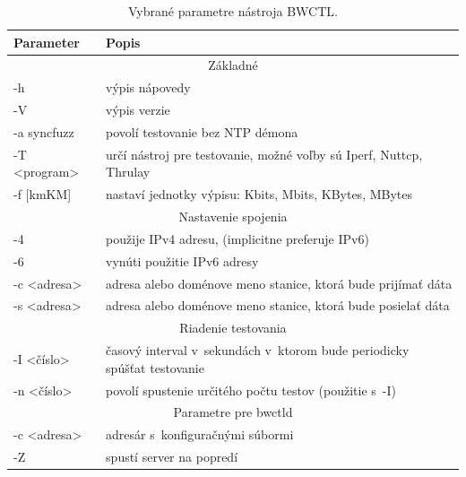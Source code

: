         \begin{table}[H]
            \begin{center}
                \begin{tabular}{|l|p{11cm}|}
                    \hline
                     \textbf{Parameter}  &  \textbf{Popis}  \\
                    \hline
                    \multicolumn{2}{|c|}{Základné} \\
                    \hline
                    -h  &  výpis nápovedy \\ 
                    -V  &  výpis verzie  \\
                    -a syncfuzz & povolí testovanie bez NTP démona \\
                    -T \textless program\textgreater & 
                        určí nástroj pre testovanie,
                        možné voľby sú Iperf, Nuttcp, Thrulay \\
                    -f [kmKM] &
                        nastaví jednotky výpisu: Kbits, Mbits,
                        KBytes, MBytes \\
                    \hline
                    \multicolumn{2}{|c|}{Nastavenie spojenia} \\
                    \hline
                    -4   &  použije IPv4 adresu, (implicitne preferuje IPv6)\\
                    -6   &  vynúti použitie IPv6 adresy \\
                    -c \textless adresa\textgreater & adresa alebo 
                        doménove meno stanice, ktorá bude prijímať dáta\\
                    -s \textless adresa\textgreater &  adresa alebo
                        doménove meno stanice, ktorá bude posielať dáta\\
                    \hline
                    \multicolumn{2}{|c|}{Riadenie testovania} \\
                    \hline
                    -I \textless číslo\textgreater & 
                        časový interval v~sekundách v~ktorom bude periodicky
                        spúšťat testovanie \\
                    -n \textless číslo\textgreater & 
                        povolí spustenie určitého počtu testov
                        (použitie s~-I) \\
                    \hline
                    \multicolumn{2}{|c|}{Parametre pre bwctld} \\
                    \hline
                    -c \textless adresa\textgreater & 
                        adresár s~konfiguračnými súbormi \\ 
                    -Z  & spustí server na popredí \\
                    \hline
                \end{tabular}
                \caption{Vybrané parametre nástroja BWCTL.} 
                \label{tab_bwctl_parametre}
            \end{center}
        \end{table}

